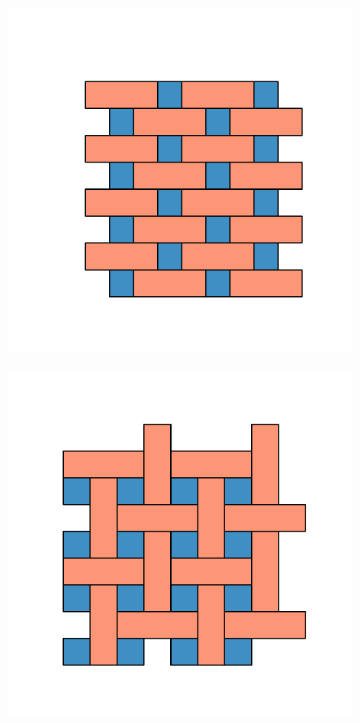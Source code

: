 \begin{figure}[bt]
\begin{subfigure}[b]{0.16\textwidth}
         \caption{}
         \label{fig:pro3pksq2}
     \end{subfigure}
     \hfill
      \begin{subfigure}[b]{0.16\textwidth}
         \centering
         \includegraphics[width=\textwidth]{./figures/procrystals/t6.pdf}
         \caption{}
         \label{fig:pro3pksq3}
     \end{subfigure}
     \hfill
        \begin{subfigure}[b]{0.16\textwidth}
         \centering
         \includegraphics[width=\textwidth]{./figures/procrystals/t3.pdf}
         \caption{}
         \label{fig:pro3pksq4}
     \end{subfigure}
     \hfill
	\vspace{0.5cm}     
          

\end{figure}
